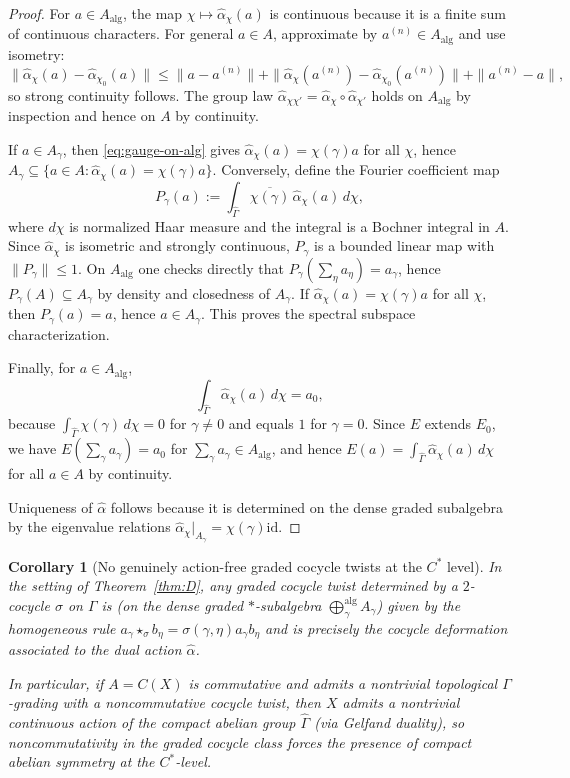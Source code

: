 \documentclass[11pt]{amsart}
\theoremstyle{plain}
\newtheorem{corollary}[theorem]{Corollary}
\theoremstyle{definition}
\theoremstyle{remark}
\begin{document}
\begin{proof}
For $a\in A_{\mathrm{alg}}$, the map $\chi\mapsto \widehat\alpha_\chi(a)$ is continuous because it is a finite sum of continuous characters.
For general $a\in A$, approximate by $a^{(n)}\in A_{\mathrm{alg}}$ and use isometry:
\[
\|\widehat\alpha_\chi(a)-\widehat\alpha_{\chi_0}(a)\|
\le
\|a-a^{(n)}\|+\|\widehat\alpha_\chi(a^{(n)})-\widehat\alpha_{\chi_0}(a^{(n)})\|+\|a^{(n)}-a\|,
\]
so strong continuity follows.
The group law $\widehat\alpha_{\chi\chi'}=\widehat\alpha_\chi\circ\widehat\alpha_{\chi'}$ holds on $A_{\mathrm{alg}}$ by inspection
and hence on $A$ by continuity.

If $a\in A_\gamma$, then \eqref{eq:gauge-on-alg} gives $\widehat\alpha_\chi(a)=\chi(\gamma)a$ for all $\chi$, hence
$A_\gamma\subseteq \{a\in A:\widehat\alpha_\chi(a)=\chi(\gamma)a\}$.
Conversely, define the Fourier coefficient map
\[
P_\gamma(a):=\int_{\widehat\Gamma}\overline{\chi(\gamma)}\,\widehat\alpha_\chi(a)\,d\chi,
\]
where $d\chi$ is normalized Haar measure and the integral is a Bochner integral in $A$.
Since $\widehat\alpha_\chi$ is isometric and strongly continuous, $P_\gamma$ is a bounded linear map with $\|P_\gamma\|\le 1$.
On $A_{\mathrm{alg}}$ one checks directly that $P_\gamma(\sum_\eta a_\eta)=a_\gamma$, hence $P_\gamma(A)\subseteq A_\gamma$ by density
and closedness of $A_\gamma$. If $\widehat\alpha_\chi(a)=\chi(\gamma)a$ for all $\chi$, then $P_\gamma(a)=a$, hence $a\in A_\gamma$.
This proves the spectral subspace characterization.

Finally, for $a\in A_{\mathrm{alg}}$,
\[
\int_{\widehat\Gamma}\widehat\alpha_\chi(a)\,d\chi = a_0,
\]
because $\int_{\widehat\Gamma}\chi(\gamma)\,d\chi=0$ for $\gamma\neq 0$ and equals $1$ for $\gamma=0$.
Since $E$ extends $E_0$, we have $E(\sum_\gamma a_\gamma)=a_0$ for $\sum_\gamma a_\gamma\in A_{\mathrm{alg}}$, and hence
$E(a)=\int_{\widehat\Gamma}\widehat\alpha_\chi(a)\,d\chi$ for all $a\in A$ by continuity.

Uniqueness of $\widehat\alpha$ follows because it is determined on the dense graded subalgebra by the eigenvalue relations
$\widehat\alpha_\chi|_{A_\gamma}=\chi(\gamma)\mathrm{id}$.
\end{proof}


\begin{corollary}[No genuinely action-free graded cocycle twists at the $C^*$ level]\label{cor:E}
In the setting of Theorem~\ref{thm:D}, any graded cocycle twist determined by a $2$-cocycle $\sigma$ on $\Gamma$
is (on the dense graded $*$-subalgebra $\bigoplus_\gamma^{\mathrm{alg}}A_\gamma$) given by the homogeneous rule
$a_\gamma\star_\sigma b_\eta=\sigma(\gamma,\eta)a_\gamma b_\eta$ and is precisely the cocycle deformation associated to the dual action
$\widehat\alpha$.

In particular, if $A=C(X)$ is commutative and admits a nontrivial topological $\Gamma$-grading with a noncommutative cocycle twist,
then $X$ admits a nontrivial continuous action of the compact abelian group $\widehat\Gamma$ (via Gelfand duality),
so noncommutativity in the graded cocycle class forces the presence of compact abelian symmetry at the $C^*$-level.
\end{corollary}
\end{document}
